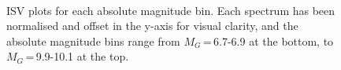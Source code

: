 \begin{figure}
    \\
    \caption{ISV plots for each absolute magnitude bin. Each spectrum has been normalised and offset in the y-axis for visual clarity, and the absolute magnitude bins range from $M_G$\,=\,6.7-6.9 at the bottom, to $M_G$\,=\,9.9-10.1 at the top.}
\end{figure}
